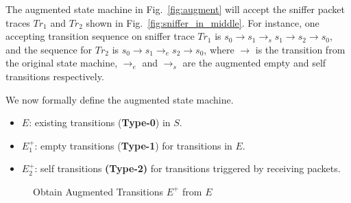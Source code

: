 The augmented state machine in Fig.~\ref{fig:augment} will accept the sniffer
packet traces $Tr_1$ and $Tr_2$ shown in Fig.~\ref{fig:sniffer_in_middle}.  For
instance, one accepting transition sequence on sniffer trace $Tr_1$ is
$s_0\rightarrow s_1 \rightarrow_s s_1\rightarrow s_2 \rightarrow s_0$, and the
sequence for $Tr_2$ is $s_0 \rightarrow s_1 \rightarrow_e s_2 \rightarrow s_0$,
where $\rightarrow$ is the transition from the original state machine,
$\rightarrow_e$ and $\rightarrow_s$ are the augmented empty and self transitions
respectively.

We now formally define the augmented state machine.

\begin{definition}
  \begin{itemize}
    \item $E$: existing transitions (\textbf{Type-0}) in $S$.
    \item $E^+_1$: empty transitions (\textbf{Type-1}) for transitions in $E$.
    \item $E^+_2$: self transitions \textbf{(Type-2)} for transitions
      triggered by receiving packets.
  \end{itemize}
\end{definition}

\begin{figure}[t!]
\begin{algorithm}[H]
  \caption{Obtain Augmented Transitions $E^+$ from $E$}
  \label{alg:augment}
  \begin{algorithmic}[1]
      \label{alg:augment:type0}
      \label{alg:augment:type1}
        \label{alg:augment:type2}
      \EndIf
    \EndFor
    \State {}
    \EndFunction
  \end{algorithmic}
\end{algorithm}
\end{figure}

